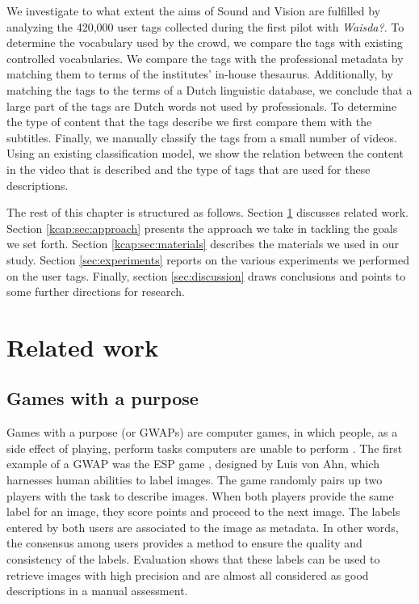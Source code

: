 We investigate to what extent the aims of Sound and Vision are fulfilled by
analyzing the 420,000 user tags collected during the first pilot with
\emph{Waisda?}. To determine the vocabulary used by the crowd, we compare the
tags with existing controlled vocabularies. We compare the tags with the
professional metadata by matching them to terms of the institutes' in-house
thesaurus. Additionally, by matching the tags to the terms of a Dutch
linguistic database, we conclude that a large part of the tags are Dutch words
not used by professionals. To determine the type of content that the tags
describe we first compare them with the subtitles. Finally, we manually
classify the tags from a small number of videos. Using an existing
classification model, we show the relation between the content in the video
that is described and the type of tags that are used for these descriptions.

The rest of this chapter is structured as follows. Section \ref{sec:related_work}
discusses related work. Section \ref{kcap:sec:approach} presents the approach we
take in tackling the goals we set forth. Section \ref{kcap:sec:materials} describes
the materials we used in our study. Section \ref{sec:experiments} reports on
the various experiments we performed on the user tags. Finally, section
\ref{sec:discussion} draws conclusions and points to some further directions
for research.

\newpage

\section{Related work}
\label{sec:related_work}

\subsection{Games with a purpose}

Games with a purpose (or GWAPs) are computer games, in which people, as a side
effect of playing, perform tasks computers are unable to perform \cite{gwap}.
The first example of a GWAP was the ESP game \cite{CHI2004:vonAhn}, designed
by Luis von Ahn, which harnesses human abilities to label images. The game
randomly pairs up two players with the task to describe images. When both
players provide the same label for an image, they score points and proceed to
the next image. The labels entered by both users are associated to the image
as metadata. In other words, the consensus among users provides a method to
ensure the quality and consistency of the labels. Evaluation shows that these
labels can be used to retrieve images with high precision and are almost all
considered as good descriptions in a manual assessment.

